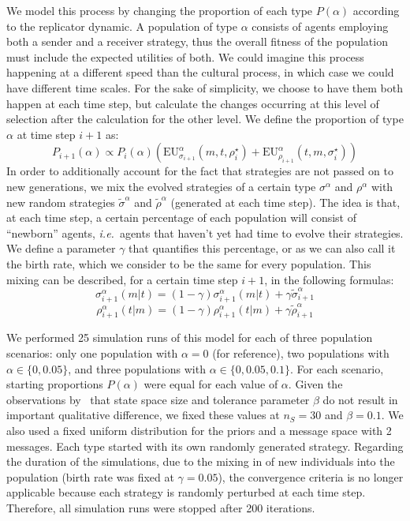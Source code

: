 \documentclass[a4paper]{article}
\begin{document}
We model this process by changing the proportion of each type $P(\alpha)$ according to the replicator dynamic.
A population of type $\alpha$ consists of agents employing both a sender and a receiver strategy, thus the overall fitness of the population must include the expected utilities of both.
We could imagine this process happening at a different speed than the cultural process, in which case we could have different time scales.
For the sake of simplicity, we choose to have them both happen at each time step, but calculate the changes occurring at this level of selection after the calculation for the other level.
We define the proportion of type $\alpha$ at time step $i+1$ as:
$$
P_{i+1}(\alpha) \propto P_i(\alpha)(\text{EU}_{\sigma_{i+1}}^{\alpha}(m,t,\rho_{i}^{\star}) + \text{EU}_{\rho_{i+1}}^{\alpha}(t,m,\sigma_{i}^{\star}))
$$
In order to additionally account for the fact that strategies are not passed on to new generations, we mix the evolved strategies of a certain type $\sigma^\alpha$ and $\rho^\alpha$ with new random strategies $\tilde{\sigma}^\alpha$ and $\tilde{\rho}^\alpha$ (generated at each time step).
The idea is that, at each time step, a certain percentage of each population will consist of ``newborn'' agents, \emph{i.e.}~agents that haven't yet had time to evolve their strategies.
We define a parameter $\gamma$ that quantifies this percentage, or as we can also call it the birth rate, which we consider to be the same for every population.
This mixing can be described, for a certain time step $i+1$, in the following formulas:
$$
\sigma_{i+1}^{\alpha}(m|t)=(1 - \gamma)\sigma_{i+1}^{\alpha}(m|t) + \gamma \tilde{\sigma}_{i+1}^{\alpha}
$$
$$
\rho_{i+1}^{\alpha}(t|m)=(1 - \gamma)\rho_{i+1}^{\alpha}(t|m) + \gamma \tilde{\rho}_{i+1}^{\alpha}
$$

We performed 25 simulation runs of this model for each of three population scenarios: only one population with $\alpha = 0$ (for reference), two populations with $\alpha \in \{0, 0.05\}$, and three populations with $\alpha \in \{0, 0.05, 0.1\}$.
For each scenario, starting proportions $P(\alpha)$ were equal for each value of $\alpha$.
Given the observations by~\textcite{franke_vagueness_2017} that state space size and tolerance parameter $\beta$ do not result in important qualitative difference, we fixed these values at $n_S = 30$ and $\beta = 0.1$.
We also used a fixed uniform distribution for the priors and a message space with 2 messages.
Each type started with its own randomly generated strategy.
Regarding the duration of the simulations, due to the mixing in of new individuals into the population (birth rate was fixed at $\gamma = 0.05$), the convergence criteria is no longer applicable because each strategy is randomly perturbed at each time step.
Therefore, all simulation runs were stopped after 200 iterations.
\end{document}
